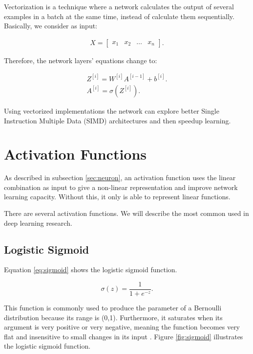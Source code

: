 Vectorization is a technique where a network calculates the output of several examples in a batch at the same time, instead of calculate them sequentially. Basically, we consider as input:

\begin{align}
X = \begin{bmatrix}
x_1 & x_2 & \dots & x_n
\end{bmatrix}.
\end{align}

Therefore, the network layers' equations change to:

\begin{align}
Z^{[i]} = W^{[i]}A^{[i-1]} + b^{[i]}.\\
A^{[i]} = \sigma(Z^{[i]}).
\end{align}

Using vectorized implementations the network can explore better Single Instruction Multiple Data (SIMD) architectures and then speedup learning.

\section{Activation Functions}\label{sec:activationfunction}
As described in subsection \ref{sec:neuron}, an activation function uses the linear combination as input to give a non-linear representation and improve network learning capacity. Without this, it only is able to represent linear functions.

There are several activation functions. We will describe the most common used in deep learning research.

\subsection{Logistic Sigmoid}

Equation \ref{eq:sigmoid} shows the logistic sigmoid function.

\begin{equation}
\sigma(z) = \frac{1}{1 + e^{-z}}.
\label{eq:sigmoid}
\end{equation}

This function is commonly used to produce the parameter of a Bernoulli distribution because its range is (0,1). Furthermore, it saturates when its argument is very positive or very negative, meaning the function becomes very flat and insensitive to small changes in its input \cite{Goodfellow-et-al-2016}. Figure \ref{fig:sigmoid} illustrates the logistic sigmoid function.

